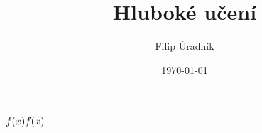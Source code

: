\documentclass{article}
\title{Hluboké učení}
\author{Filip Úradník}
\date{\today}
\begin{document}
\maketitle

$ \fce{f}{x} f(x) $
\end{document}
